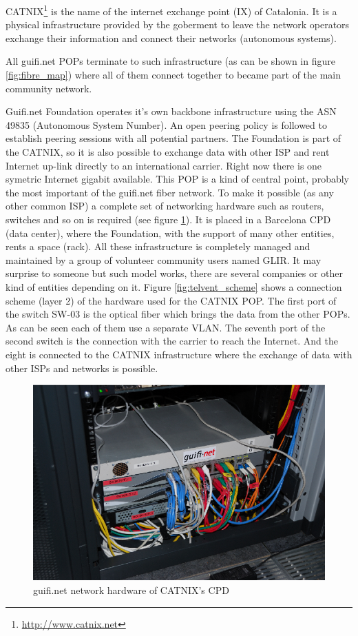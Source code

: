 CATNIX\footnote{\url{http://www.catnix.net}} is the name of the internet exchange point (IX) of Catalonia. 
It is a physical infrastructure provided by the goberment to leave the network operators exchange their 
information and connect their networks (autonomous systems). 

\medskip
All guifi.net POPs terminate to such infrastructure (as can be shown in figure \ref{fig:fibre_map}) where
all of them connect together to became part of the main community network. 

\medskip
Guifi.net Foundation operates it's own backbone infrastructure using the ASN 49835 (Autonomous System Number). 
An open peering policy is followed to establish peering sessions with all potential partners.
The Foundation is part of the CATNIX, so it is also possible to exchange data with other ISP and
rent Internet up-link directly to an international carrier. Right now there is one symetric Internet gigabit 
available.
\medskip
This POP is a kind of central point, probably the most important of the guifi.net fiber network. 
To make it possible (as any other common ISP) a complete set of networking hardware such as routers, switches and so on is required (see figure \ref{fig:telvent_foto}). 
It is placed in a Barcelona CPD (data center), where the Foundation, with the support of many other entities, rents a space (rack).
\newline
All these infrastructure is completely managed and maintained by a group of volunteer community users named GLIR. 
It may surprise to someone but such model works, there are several companies or other kind of entities depending on it.
\newline
Figure \ref{fig:telvent_scheme} shows a connection scheme (layer 2) of the hardware used for the CATNIX POP. 
The first port of the switch SW-03 is the optical fiber which brings the data from the other POPs. As can be seen each
of them use a separate VLAN. The seventh port of the second switch is the connection with the carrier to reach the Internet.
And the eight is connected to the CATNIX infrastructure where the exchange of data with other ISPs and networks is possible. 


\begin{figure}[htbp]
  \centering
  \includegraphics[scale=.99]{sect3/figures/telvent_foto.eps} 
  \caption{guifi.net network hardware of CATNIX's CPD}
  \label{fig:telvent_foto}
\end{figure}

